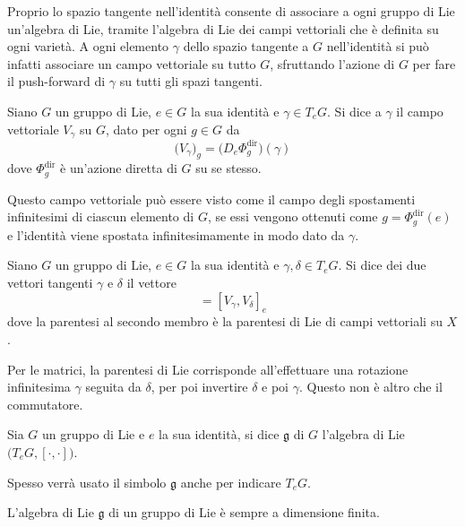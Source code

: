 Proprio lo spazio tangente nell'identità consente di associare a ogni gruppo di Lie un'algebra di Lie, tramite l'algebra di Lie dei campi vettoriali che è definita su ogni varietà. A ogni elemento $\gamma$ dello spazio tangente a $G$ nell'identità si può infatti associare un campo vettoriale su tutto $G$, sfruttando l'azione di $G$ per fare il push-forward di $\gamma$ su tutti gli spazi tangenti.
\begin{definition}
  Siano $G$ un gruppo di Lie, $e \in G$ la sua identità e $\gamma \in T_e G$. Si dice  a $\gamma$ il campo vettoriale $V_\gamma$ su $G$, dato per ogni $g \in G$ da \begin{equation*}
  \big(V_\gamma\big)_g = \big(D_e \Phi^{\text{dir}}_g\big) (\gamma)
  \end{equation*} 
  dove $\Phi^{\text{dir}}_g$ è un'azione diretta di $G$ su se stesso.
\end{definition}
\begin{remark}
  Questo campo vettoriale può essere visto come il campo degli spostamenti infinitesimi di ciascun elemento di $G$, se essi vengono ottenuti come $g=\Phi^{\text{dir}}_g(e)$ e l'identità viene spostata infinitesimamente in modo dato da $\gamma$.
\end{remark}
\begin{definition}
  Siano $G$ un gruppo di Lie, $e \in G$ la sua identità e $\gamma, \delta \in T_e G$. Si dice  dei due vettori tangenti $\gamma$ e $\delta$ il vettore \begin{equation*}
  [\gamma,\delta] = [V_{\gamma}, V_{\delta}]_e
  \end{equation*} 
  dove la parentesi al secondo membro è la parentesi di Lie di campi vettoriali su $X$.
\end{definition}
\begin{remark}
  Per le matrici, la parentesi di Lie corrisponde all'effettuare una rotazione infinitesima $\gamma$ seguita da $\delta$, per poi invertire $\delta$ e poi $\gamma$. Questo non è altro che il commutatore.
\end{remark}
\begin{definition}
  Sia $G$ un gruppo di Lie e $e$ la sua identità, si dice  $\mathfrak{g}$ di $G$ l'algebra di Lie $\big(T_e G, [\cdot ,\cdot ]\big)$.
\end{definition}
\begin{remark}
  Spesso verrà usato il simbolo $\mathfrak{g}$ anche per indicare $T_e G$.
\end{remark}
\begin{theorem}
  L'algebra di Lie $\mathfrak{g}$ di un gruppo di Lie è sempre a dimensione finita.
\end{theorem}


